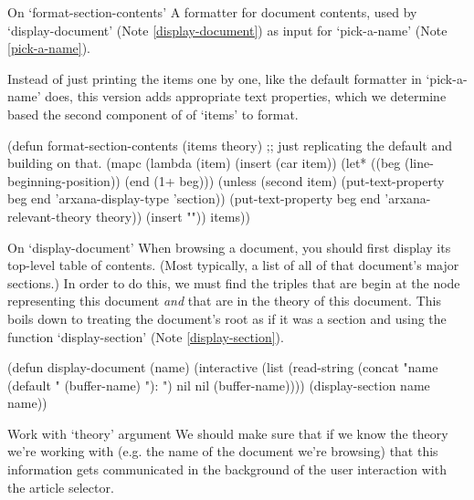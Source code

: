 \begin{notate}{On `format-section-contents'} \label{format-section-contents}
A formatter for document contents, used by
`display-document' (Note \ref{display-document}) as input
for `pick-a-name' (Note \ref{pick-a-name}).

Instead of just printing the items one by one,
like the default formatter in `pick-a-name'  does,
this version adds appropriate text properties, which
we determine based the second component of
of `items' to format.
\end{notate}

\begin{elisp}
(defun format-section-contents (items theory)
  ;; just replicating the default and building on that.
  (mapc (lambda (item)
          (insert (car item))
          (let* ((beg (line-beginning-position))
                 (end (1+ beg)))
            (unless (second item)
              (put-text-property beg end
                                 'arxana-display-type
                                 'section))
            (put-text-property beg end
                               'arxana-relevant-theory
                               theory))
          (insert "\n"))
        items))
\end{elisp}

\begin{notate}{On `display-document'} \label{display-document}
When browsing a document, you should first display its
top-level table of contents.  (Most typically, a list of
all of that document's major sections.)  In order to do
this, we must find the triples that are begin at the node
representing this document \emph{and} that are in the
theory of this document.  This boils down to treating the
document's root as if it was a section and using the
function `display-section' (Note \ref{display-section}).
\end{notate}

\begin{elisp}
(defun display-document (name)
  (interactive (list (read-string
                      (concat
                       "name (default "
                       (buffer-name) "): ")
                      nil nil (buffer-name))))
  (display-section name name))
\end{elisp}

\begin{notate}{Work with `theory' argument}
We should make sure that if we know the theory we're
working with (e.g. the name of the document we're
browsing) that this information gets communicated in the
background of the user interaction with the article
selector.
\end{notate}

